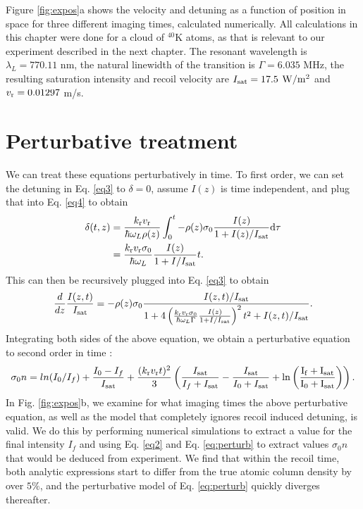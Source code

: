 Figure \ref{fig:expos}a shows the velocity and detuning as a function of position in space for three different imaging times, calculated numerically. All calculations in this chapter were done for a cloud of $^{40}\mathrm{K}$ atoms, as that is relevant to our experiment described in the next chapter. The resonant wavelength is $\lambda_L = 770.11$ nm, the natural linewidth of the transition is $\Gamma =  6.035$ MHz, the resulting saturation intensity and recoil velocity are $I_{\rm sat} = 17.5$ $ \rm{W/m^2}$ and $v_{\rm r}=0.01297$ m/s.  

\section{Perturbative treatment}
We can treat these equations perturbatively in time. To first order, we can set the detuning in Eq. \ref{eq3} to $\delta=0$, assume $I(z)$ is time independent, and plug that into Eq. \ref{eq4} to obtain 
\begin{align}
\delta(t,z)&=\frac{ k_{\rm{r}} v_{\rm{r}}}{\hbar\omega_L\rho(z)}\int_0^t-\rho(z)\sigma_0\frac{I(z)}{1+I(z)/I_{\rm{sat}}}\mathrm{d}\tau \\
&=\frac{ k_{\rm{r}} v_{\rm{r}}\sigma_0}{\hbar\omega_L}\frac{I(z)}{1+I/I_{\rm{sat}}}t.
\label{eq:recursive}
\end{align} 
This can then be recursively plugged into Eq. \ref{eq3} to obtain
\begin{equation}
\frac{d}{dz}\frac{I(z,t)}{I_{\rm{sat}}}=-\rho(z)\sigma_0\frac{I(z,t)/I_{\rm{sat}}}{1+4\left(\frac{ k_{\rm{r}} v_{\rm{r}}\sigma_0}{\hbar\omega_L\Gamma}\frac{I(z)}{1+I/I_{\rm{sat}}}\right)^2 t^2 +I(z,t)/I_{\rm{sat}}}.
\end{equation}
Integrating both sides of the above equation, we obtain a perturbative equation to second order in time \cite{LJLthesis}:
\begin{equation}
\sigma_0 n = ln(I_0/I_f) + \frac{I_0-I_f}{I_{\rm{sat}}} + \frac{ (k_{\rm{r}} v_{\rm{r}} t)^2}{3}\left(\frac{I_{\rm{sat}}}{I_f+I_{\rm{sat}}}-\frac{I_{\rm{sat}}}{I_0+I_{\rm{sat}}} +\rm{ ln}\left(\frac{I_f+I_{\rm{sat}}}{I_0+I_{\rm{sat}}}\right)\right).
\label{eq:perturb}
\end{equation}
In Fig. \ref{fig:expos}b, we examine for what imaging times the above perturbative equation, as well as the model that completely ignores recoil induced detuning, is valid. We do this by performing numerical simulations to extract a value for the final intensity $I_f$ and using Eq. \ref{eq2} and Eq. \ref{eq:perturb} to extract values $\sigma_0 n$ that would be deduced from experiment. We find that within the recoil time, both analytic expressions start to differ from the true atomic column density by over $5\%$, and the perturbative model of Eq. \ref{eq:perturb} quickly diverges thereafter. 

